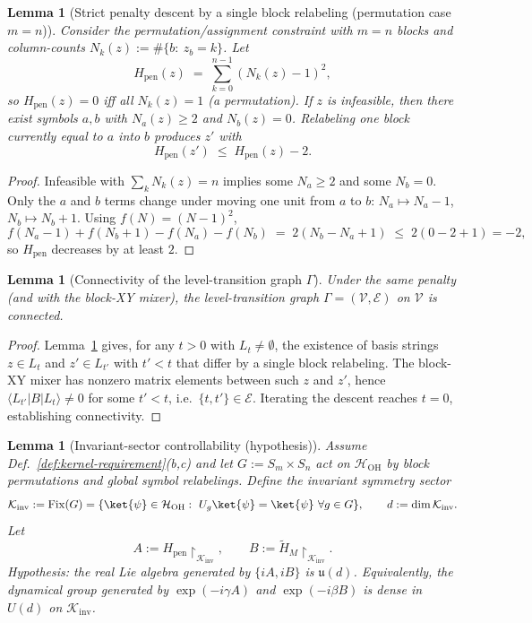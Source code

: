 \documentclass[a4paper,unpublished,onecolumn,11pt]{quantumarticle}
\newtheorem{lemma}[theorem]{Lemma}
\theoremstyle{definition}
\theoremstyle{remark}
\newcommand{\OH}{\mathcal{H}_{\mathrm{OH}}}
\begin{document}
\begin{lemma}[Strict penalty descent by a single block relabeling (permutation case $m=n$)]
\label{lem:descent}
Consider the permutation/assignment constraint with $m=n$ blocks and column-counts
$N_k(z):=\#\{b:\ z_b=k\}$.
Let
\[
  H_{\mathrm{pen}}(z) \;=\; \sum_{k=0}^{n-1} (N_k(z)-1)^2,
\]
so $H_{\mathrm{pen}}(z)=0$ iff all $N_k(z)=1$ (a permutation).
If $z$ is infeasible, then there exist symbols $a,b$ with $N_a(z)\ge 2$ and $N_b(z)=0$.
Relabeling one block currently equal to $a$ into $b$ produces $z'$ with
\[
  H_{\mathrm{pen}}(z') \;\le\; H_{\mathrm{pen}}(z) - 2.
\]
\end{lemma}

\begin{proof}
Infeasible with $\sum_k N_k(z)=n$ implies some $N_a\ge 2$ and some $N_b=0$. Only the $a$ and $b$ terms change under moving one unit from $a$ to $b$: $N_a\mapsto N_a-1$, $N_b\mapsto N_b+1$. Using $f(N)=(N-1)^2$,
\[
  f(N_a-1)+f(N_b+1)-f(N_a)-f(N_b)
  \;=\;
  2(N_b-N_a+1)
  \;\le\;
  2(0-2+1)=-2,
\]
so $H_{\mathrm{pen}}$ decreases by at least $2$.
\end{proof}
\begin{lemma}[Connectivity of the level-transition graph $\Gamma$]
\label{lem:connected-graph}
Under the same penalty (and with the block-XY mixer),
the level-transition graph $\Gamma=(\mathcal V,\mathcal E)$ on $\mathcal V$ is connected.
\end{lemma}

\begin{proof}
Lemma~\ref{lem:descent} gives, for any $t>0$ with $L_t\neq\emptyset$, the existence of basis strings
$z\in L_t$ and $z'\in L_{t'}$ with $t'<t$ that differ by a single block relabeling. The block-XY mixer has nonzero matrix elements between such $z$ and $z'$, hence $\langle L_{t'}|B|L_t\rangle\neq 0$ for some $t'<t$, i.e.\ $\{t,t'\}\in\mathcal E$. Iterating the descent reaches $t=0$, establishing connectivity.
\end{proof}

\begin{lemma}[Invariant-sector controllability (hypothesis)]
\label{lem:connected-implies-su}
Assume Def.~\ref{def:kernel-requirement}(b,c) and let $G:=S_m\times S_n$ act on $\OH$ by
block permutations and global symbol relabelings. Define the invariant symmetry sector
\[
\mathcal K_{\mathrm{inv}}:=\mathrm{Fix}(G)
=\{\ket{\psi}\in\OH:\ U_g\ket{\psi}=\ket{\psi}\ \forall g\in G\},
\qquad d:=\dim\mathcal K_{\mathrm{inv}}.
\]
Let
\[
A:=H_{\mathrm{pen}}\!\upharpoonright_{\mathcal K_{\mathrm{inv}}},
\qquad
B:=\widetilde H_M\!\upharpoonright_{\mathcal K_{\mathrm{inv}}}.
\]
\emph{Hypothesis:} the real Lie algebra generated by $\{iA,iB\}$ is $\mathfrak u(d)$.
Equivalently, the dynamical group generated by $\exp(-i\gamma A)$ and $\exp(-i\beta B)$
is dense in $U(d)$ on $\mathcal K_{\mathrm{inv}}$.
\end{lemma}
\end{document}
